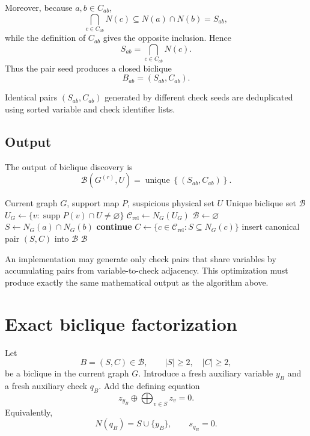 \documentclass[11pt,a4paper]{article}
\newcommand{\supp}{\operatorname{supp}}
\newcommand{\Bcal}{\mathcal B}
\newcommand{\Crel}{\mathcal C_{\mathrm{rel}}}
\begin{document}
Moreover, because $a,b\in C_{ab}$,
\[
\bigcap_{c\in C_{ab}}N(c)
\subseteq
N(a)\cap N(b)
=
S_{ab},
\]
while the definition of $C_{ab}$ gives the opposite inclusion. Hence
\[
\boxed{
S_{ab}
=
\bigcap_{c\in C_{ab}}N(c).
}
\]
Thus the pair seed produces a closed biclique
\[
B_{ab}=(S_{ab},C_{ab}).
\]

Identical pairs $(S_{ab},C_{ab})$ generated by different check seeds are
deduplicated using sorted variable and check identifier lists.

\subsection{Output}

The output of biclique discovery is
\[
\boxed{
\Bcal(G^{(r)},U)
=
\operatorname{unique}
\left\{
(S_{ab},C_{ab})
\right\}.
}
\]

\begin{algorithm}[H]
\caption{\textsc{DiscoverBicliques}}
\begin{algorithmic}[1]
\Require Current graph $G$, support map $P$, suspicious physical set $U$
\Ensure Unique biclique set $\Bcal$
\State $U_G\gets\{v:\supp P(v)\cap U\ne\varnothing\}$
\State $\Crel\gets N_G(U_G)$
\State $\Bcal\gets\varnothing$
\ForAll{unordered pairs $a<b$ in $\Crel$}
    \State $S\gets N_G(a)\cap N_G(b)$
        \State \textbf{continue}
    \EndIf
    \State $C\gets\{c\in\Crel:S\subseteq N_G(c)\}$
    \State insert canonical pair $(S,C)$ into $\Bcal$
\EndFor
\State \Return $\Bcal$
\end{algorithmic}
\end{algorithm}

An implementation may generate only check pairs that share variables by
accumulating pairs from variable-to-check adjacency. This optimization must
produce exactly the same mathematical output as the algorithm above.

\section{Exact biclique factorization}

Let
\[
B=(S,C)\in\Bcal,
\qquad
|S|\ge2,\quad |C|\ge2,
\]
be a biclique in the current graph $G$. Introduce a fresh auxiliary variable
$y_B$ and a fresh auxiliary check $q_B$. Add the defining equation
\[
\boxed{
z_{y_B}
\oplus
\bigoplus_{v\in S}z_v
=0.
}
\]
Equivalently,
\[
N(q_B)=S\cup\{y_B\},
\qquad
s_{q_B}=0.
\]
\end{document}
